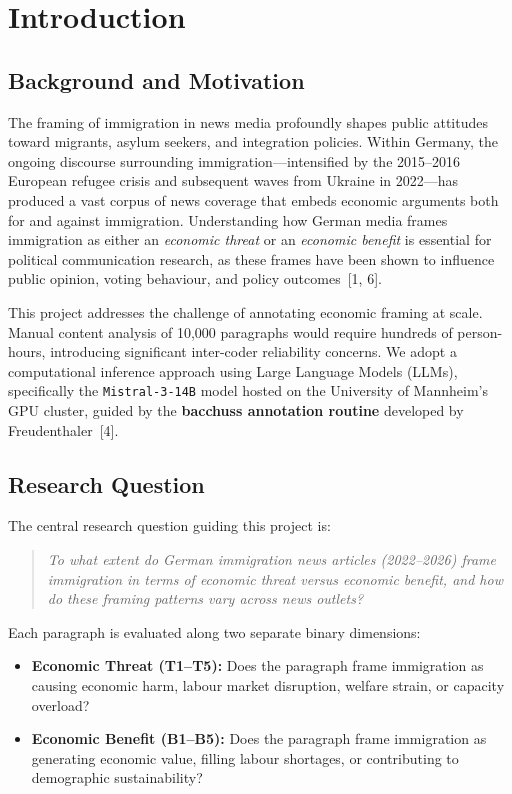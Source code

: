 \section{Introduction}
\label{sec:introduction}

\subsection{Background and Motivation}

The framing of immigration in news media profoundly shapes public attitudes toward migrants, asylum seekers, and integration policies. Within Germany, the ongoing discourse surrounding immigration---intensified by the 2015--2016 European refugee crisis and subsequent waves from Ukraine in 2022---has produced a vast corpus of news coverage that embeds economic arguments both for and against immigration. Understanding how German media frames immigration as either an \textit{economic threat} or an \textit{economic benefit} is essential for political communication research, as these frames have been shown to influence public opinion, voting behaviour, and policy outcomes~[1, 6].

This project addresses the challenge of annotating economic framing at scale. Manual content analysis of 10,000 paragraphs would require hundreds of person-hours, introducing significant inter-coder reliability concerns. We adopt a computational inference approach using Large Language Models (LLMs), specifically the \texttt{Mistral-3-14B} model hosted on the University of Mannheim's GPU cluster, guided by the \textbf{bacchuss annotation routine} developed by Freudenthaler~[4].

\subsection{Research Question}

The central research question guiding this project is:

\begin{quote}
\textit{To what extent do German immigration news articles (2022--2026) frame immigration in terms of economic threat versus economic benefit, and how do these framing patterns vary across news outlets?}
\end{quote}

Each paragraph is evaluated along two separate binary dimensions:
\begin{itemize}
    \item \textbf{Economic Threat (T1--T5):} Does the paragraph frame immigration as causing economic harm, labour market disruption, welfare strain, or capacity overload?
    \item \textbf{Economic Benefit (B1--B5):} Does the paragraph frame immigration as generating economic value, filling labour shortages, or contributing to demographic sustainability?
\end{itemize}

